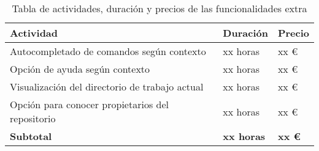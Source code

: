 \begin{table}[!ht]
\begin{center}
\begin{tabular}{|p{80mm}|p{25mm}|p{20mm}|} \hline 
\textbf{Actividad} & \textbf{Duración} & \textbf{Precio} \\ \hline

Autocompletado de comandos según contexto &
xx horas &
xx \euro{}
\\
\hline

Opción de ayuda según contexto &
xx horas &
xx \euro{}
\\
\hline

Visualización del directorio de trabajo actual &
xx horas &
xx \euro{}
\\
\hline

Opción para conocer propietarios del repositorio &
xx horas &
xx \euro{}
\\
\hline \hline

{\bfseries Subtotal} &
{\bfseries xx horas} &
{\bfseries xx \euro{}}
\\
\hline

\end{tabular}
\end{center}
\caption{Tabla de actividades, duración y precios de las funcionalidades extra}
\label{table:resOthers2}
\end{table}

